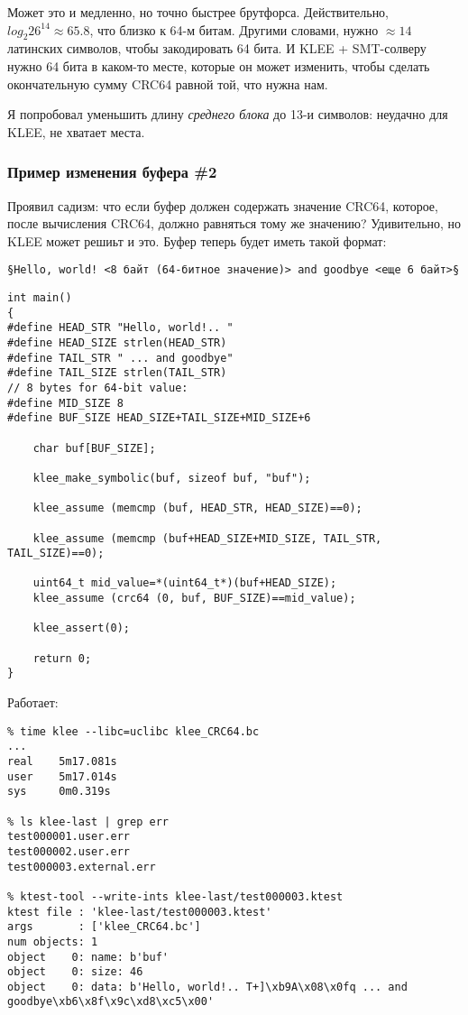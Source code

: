 Может это и медленно, но точно быстрее брутфорса.
Действительно, $log_2{26^{14}} \approx 65.8$, что близко к 64-м битам.
Другими словами, нужно $\approx 14$ латинских символов, чтобы закодировать 64 бита.
И KLEE + \ac{SMT}-солверу нужно 64 бита в каком-то месте, которые он может изменить, чтобы сделать окончательную сумму
CRC64 равной той, что нужна нам.

Я попробовал уменьшить длину \textit{среднего блока} до 13-и символов: неудачно для KLEE, не хватает места.

\subsubsection{Пример изменения буфера \#2}

Проявил садизм: что если буфер должен содержать значение CRC64, которое, после вычисления CRC64, должно равняться тому же значению?
Удивительно, но KLEE может решиьт и это.
Буфер теперь будет иметь такой формат:

\begin{lstlisting}
§Hello, world! <8 байт (64-битное значение)> and goodbye <еще 6 байт>§
\end{lstlisting}

\begin{lstlisting}
int main()
{
#define HEAD_STR "Hello, world!.. "
#define HEAD_SIZE strlen(HEAD_STR)
#define TAIL_STR " ... and goodbye"
#define TAIL_SIZE strlen(TAIL_STR)
// 8 bytes for 64-bit value:
#define MID_SIZE 8
#define BUF_SIZE HEAD_SIZE+TAIL_SIZE+MID_SIZE+6

	char buf[BUF_SIZE];
  
	klee_make_symbolic(buf, sizeof buf, "buf");

	klee_assume (memcmp (buf, HEAD_STR, HEAD_SIZE)==0);

	klee_assume (memcmp (buf+HEAD_SIZE+MID_SIZE, TAIL_STR, TAIL_SIZE)==0);
	
	uint64_t mid_value=*(uint64_t*)(buf+HEAD_SIZE);
	klee_assume (crc64 (0, buf, BUF_SIZE)==mid_value);

	klee_assert(0);

	return 0;
}
\end{lstlisting}

Работает:

\begin{lstlisting}
% time klee --libc=uclibc klee_CRC64.bc
...
real    5m17.081s
user    5m17.014s
sys     0m0.319s

% ls klee-last | grep err
test000001.user.err
test000002.user.err
test000003.external.err

% ktest-tool --write-ints klee-last/test000003.ktest
ktest file : 'klee-last/test000003.ktest'
args       : ['klee_CRC64.bc']
num objects: 1
object    0: name: b'buf'
object    0: size: 46
object    0: data: b'Hello, world!.. T+]\xb9A\x08\x0fq ... and goodbye\xb6\x8f\x9c\xd8\xc5\x00'
\end{lstlisting}

